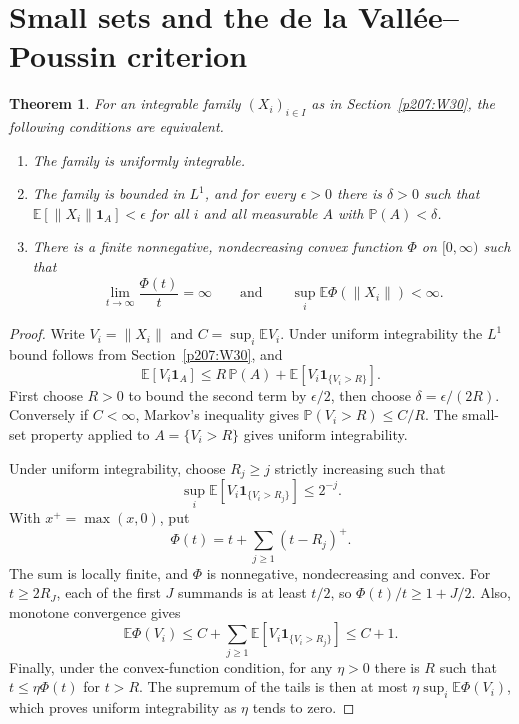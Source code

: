 \documentclass[11pt,oneside,openany]{book}
\theoremstyle{plain}
\newtheorem{theorem}{Theorem}[chapter]
\theoremstyle{definition}
\theoremstyle{remark}
\begin{document}
\section{Small sets and the de la Vallée--Poussin criterion}
\label{p207:W31}

\begin{theorem}
For an integrable family \((X_i)_{i\in I}\) as in
Section~\ref{p207:W30}, the following conditions are equivalent.
\begin{enumerate}
 \item The family is uniformly integrable.
 \item The family is bounded in \(L^1\), and for every \(\epsilon>0\)
       there is \(\delta>0\) such that
       \(\mathbb E[\lVert X_i\rVert\mathbf 1_A]<\epsilon\)
       for all \(i\) and all measurable \(A\) with
       \(\mathbb P(A)<\delta\).
 \item There is a finite nonnegative, nondecreasing convex function
       \(\Phi\) on \([0,\infty)\) such that
       \[
          \lim_{t\to\infty}\frac{\Phi(t)}{t}=\infty
          \qquad\text{and}\qquad
          \sup_i\mathbb E\Phi(\lVert X_i\rVert)<\infty.
       \]
\end{enumerate}
\end{theorem}

\begin{proof}
Write \(V_i=\lVert X_i\rVert\) and \(C=\sup_i\mathbb EV_i\).
Under uniform integrability the \(L^1\) bound follows from
Section~\ref{p207:W30}, and
\[
 \mathbb E[V_i\mathbf 1_A]
 \le R\,\mathbb P(A)+\mathbb E[V_i\mathbf 1_{\{V_i>R\}}].
\]
First choose \(R>0\) to bound the second term by \(\epsilon/2\),
then choose \(\delta=\epsilon/(2R)\).
Conversely if \(C<\infty\), Markov's inequality
gives \(\mathbb P(V_i>R)\le C/R\). The small-set property applied
to \(A=\{V_i>R\}\) gives uniform integrability.

Under uniform integrability, choose \(R_j\ge j\) strictly increasing
such that
\[
 \sup_i\mathbb E[V_i\mathbf 1_{\{V_i>R_j\}}]\le 2^{-j}.
\]
With \(x^+=\max(x,0)\), put
\[
 \Phi(t)=t+\sum_{j\ge1}(t-R_j)^+ .
\]
The sum is locally finite, and \(\Phi\) is nonnegative,
nondecreasing and convex. For \(t\ge2R_J\), each of the first \(J\)
summands is at least \(t/2\), so
\(\Phi(t)/t\ge1+J/2\). Also, monotone convergence gives
\[
 \mathbb E\Phi(V_i)\le C+
     \sum_{j\ge1}\mathbb E[V_i\mathbf 1_{\{V_i>R_j\}}]\le C+1.
\]
Finally, under the convex-function condition, for any \(\eta>0\)
there is \(R\) such that \(t\le\eta\Phi(t)\) for \(t>R\).
The supremum of the tails is then at most
\(\eta\sup_i\mathbb E\Phi(V_i)\), which proves uniform
integrability as \(\eta\) tends to zero.
\end{proof}
\end{document}
